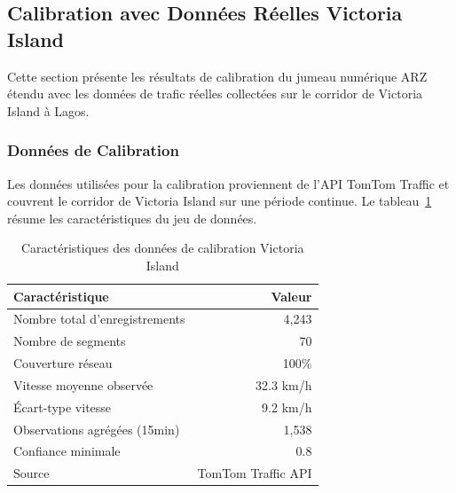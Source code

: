 
\subsection{Calibration avec Données Réelles Victoria Island}
\label{subsec:calibration_victoria_island}

Cette section présente les résultats de calibration du jumeau numérique ARZ étendu
avec les données de trafic réelles collectées sur le corridor de Victoria Island à Lagos.

\subsubsection{Données de Calibration}

Les données utilisées pour la calibration proviennent de l'API TomTom Traffic et couvrent
le corridor de Victoria Island sur une période continue. Le tableau~\ref{tab:data_quality_74}
résume les caractéristiques du jeu de données.

\begin{table}[h]
    \centering
    \caption{Caractéristiques des données de calibration Victoria Island}
    \label{tab:data_quality_74}
    \begin{tabular}{|l|r|}
        \hline
        \textbf{Caractéristique}       & \textbf{Valeur}    \\
        \hline
        Nombre total d'enregistrements & 4,243              \\
        Nombre de segments             & 70                 \\
        Couverture réseau              & 100\%              \\
        Vitesse moyenne observée       & 32.3 km/h          \\
        Écart-type vitesse             & 9.2 km/h           \\
        Observations agrégées (15min)  & 1,538              \\
        Confiance minimale             & 0.8                \\
        Source                         & TomTom Traffic API \\
        \hline
    \end{tabular}
\end{table}

